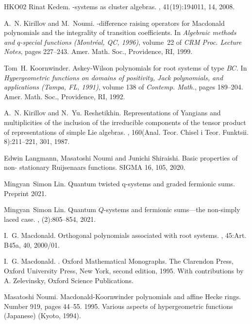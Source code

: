 \documentclass[12pt]{amsart}
\numberwithin{equation}{section}
\begin{document}
\begin{thebibliography}{HKO{\etalchar{+}}02}
Rinat Kedem.
-systems as cluster algebras.
, 41(19):194011, 14, 2008.

A.~N. Kirillov and M.~Noumi.
-difference raising operators for {M}acdonald polynomials and
  the integrality of transition coefficients.
\newblock In {\em Algebraic methods and {$q$}-special functions ({M}ontr\'eal,
  {QC}, 1996)}, volume~22 of {\em CRM Proc. Lecture Notes}, pages 227--243.
  Amer. Math. Soc., Providence, RI, 1999.

Tom~H. Koornwinder.
\newblock Askey-{W}ilson polynomials for root systems of type {$BC$}.
\newblock In {\em Hypergeometric functions on domains of positivity, {J}ack
  polynomials, and applications ({T}ampa, {FL}, 1991)}, volume 138 of {\em
  Contemp. Math.}, pages 189--204. Amer. Math. Soc., Providence, RI, 1992.

A.~N. Kirillov and N.~Yu. Reshetikhin.
\newblock Representations of {Y}angians and multiplicities of the inclusion of
  the irreducible components of the tensor product of representations of simple
  {L}ie algebras.
,
  160(Anal. Teor. Chisel i Teor. Funktsii. 8):211--221, 301, 1987.

Edwin Langmann, Masatoshi Noumi and Junichi Shiraishi.
\newblock Basic properties of non- stationary {R}uijsenaars functions.
\newblock SIGMA 16, 105, 2020.

Mingyan~Simon Lin.
\newblock Quantum twisted q-systems and graded fermionic sums.
\newblock Preprint 2021.

Mingyan~Simon Lin.
\newblock Quantum {$Q$}-systems and fermionic sums---the non-simply laced case.
, (2):805--854, 2021.

I.~G. Macdonald.
\newblock Orthogonal polynomials associated with root systems.
, 45:Art. B45a, 40, 2000/01.

I.~G. Macdonald.
.
\newblock Oxford Mathematical Monographs. The Clarendon Press, Oxford
  University Press, New York, second edition, 1995.
\newblock With contributions by A. Zelevinsky, Oxford Science Publications.

Masatoshi Noumi.
\newblock Macdonald-{K}oornwinder polynomials and affine {H}ecke rings.
\newblock Number 919, pages 44--55. 1995.
\newblock Various aspects of hypergeometric functions (Japanese) (Kyoto, 1994).


\end{thebibliography}
\end{document}
